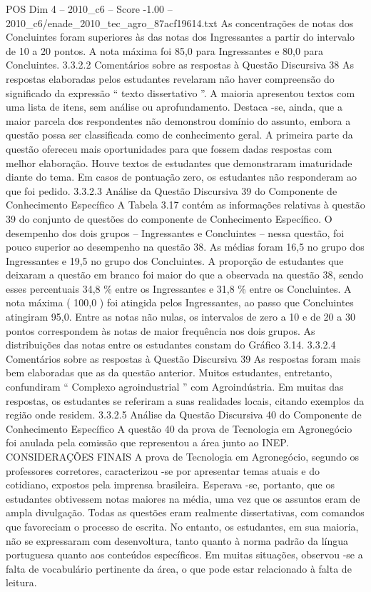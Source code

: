 \begin{textsample}{POS Dim 4 – 2010\_c6 – Score -1.00 – 2010\_c6/enade\_2010\_tec\_agro\_87acf19614.txt}
As concentrações de notas dos Concluintes foram superiores às das notas dos Ingressantes a partir do intervalo de 10 a 20 pontos.
A nota máxima foi 85,0 para Ingressantes e 80,0 para Concluintes. 3.3.2.2 Comentários sobre as respostas à Questão Discursiva 38 As respostas elaboradas pelos estudantes revelaram não haver compreensão do significado da expressão “ texto dissertativo ”.
A maioria apresentou textos com uma lista de itens, sem análise ou aprofundamento.
Destaca -se, ainda, que a maior parcela dos respondentes não demonstrou domínio do assunto, embora a questão possa ser classificada como de conhecimento geral.
A primeira parte da questão ofereceu mais oportunidades para que fossem dadas respostas com melhor elaboração.
Houve textos de estudantes que demonstraram imaturidade diante do tema.
Em casos de pontuação zero, os estudantes não responderam ao que foi pedido. 3.3.2.3 Análise da Questão Discursiva 39 do Componente de Conhecimento Específico A Tabela 3.17 contém as informações relativas à questão 39 do conjunto de questões do componente de Conhecimento Específico.
O desempenho dos dois grupos – Ingressantes e Concluintes – nessa questão, foi pouco superior ao desempenho na questão 38.
As médias foram 16,5 no grupo dos Ingressantes e 19,5 no grupo dos Concluintes.
A proporção de estudantes que deixaram a questão em branco foi maior do que a observada na questão 38, sendo esses percentuais 34,8 \% entre os Ingressantes e 31,8 \% entre os Concluintes.
A nota máxima ( 100,0 ) foi atingida pelos Ingressantes, ao passo que Concluintes atingiram 95,0.
Entre as notas não nulas, os intervalos de zero a 10 e de 20 a 30 pontos correspondem às notas de maior frequência nos dois grupos.
As distribuições das notas entre os estudantes constam do Gráfico 3.14. 3.3.2.4 Comentários sobre as respostas à Questão Discursiva 39 As respostas foram mais bem elaboradas que as da questão anterior.
Muitos estudantes, entretanto, confundiram “ Complexo agroindustrial ” com Agroindústria.
Em muitas das respostas, os estudantes se referiram a suas realidades locais, citando exemplos da região onde residem. 3.3.2.5 Análise da Questão Discursiva 40 do Componente de Conhecimento Específico A questão 40 da prova de Tecnologia em Agronegócio foi anulada pela comissão que representou a área junto ao INEP.
CONSIDERAÇÕES FINAIS A prova de Tecnologia em Agronegócio, segundo os professores corretores, caracterizou -se por apresentar temas atuais e do cotidiano, expostos pela imprensa brasileira.
Esperava -se, portanto, que os estudantes obtivessem notas maiores na média, uma vez que os assuntos eram de ampla divulgação.
Todas as questões eram realmente dissertativas, com comandos que favoreciam o processo de escrita.
No entanto, os estudantes, em sua maioria, não se expressaram com desenvoltura, tanto quanto à norma padrão da língua portuguesa quanto aos conteúdos específicos.
Em muitas situações, observou -se a falta de vocabulário pertinente da área, o que pode estar relacionado à falta de leitura.

\end{textsample}
